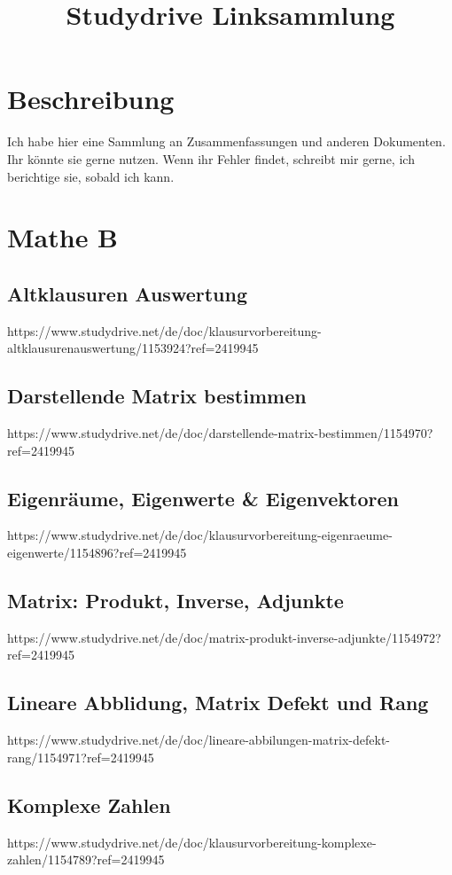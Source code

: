 \documentclass[11pt]{article}
\begin{document}
    \title{Studydrive Linksammlung}
    \section{Beschreibung}
    Ich habe hier eine Sammlung an Zusammenfassungen und anderen Dokumenten.
    Ihr könnte sie gerne nutzen.
    Wenn ihr Fehler findet, schreibt mir gerne, ich berichtige sie, sobald ich kann.
    \section{Mathe B}
    \subsection{Altklausuren Auswertung}
    https://www.studydrive.net/de/doc/klausurvorbereitung-altklausurenauswertung/1153924?ref=2419945
    \subsection{Darstellende Matrix bestimmen}
    https://www.studydrive.net/de/doc/darstellende-matrix-bestimmen/1154970?ref=2419945
    \subsection{Eigenräume, Eigenwerte & Eigenvektoren}
    https://www.studydrive.net/de/doc/klausurvorbereitung-eigenraeume-eigenwerte/1154896?ref=2419945
    \subsection{Matrix: Produkt, Inverse, Adjunkte}
    https://www.studydrive.net/de/doc/matrix-produkt-inverse-adjunkte/1154972?ref=2419945
    \subsection{Lineare Abblidung, Matrix Defekt und Rang}
    https://www.studydrive.net/de/doc/lineare-abbilungen-matrix-defekt-rang/1154971?ref=2419945
    \subsection{Komplexe Zahlen}
    https://www.studydrive.net/de/doc/klausurvorbereitung-komplexe-zahlen/1154789?ref=2419945
\end{document}
